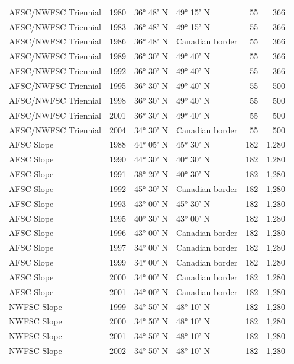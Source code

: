 \documentclass[
]{scrartcl}
\begin{document}
\begin{longtable}{lrllrr}
AFSC/NWFSC Triennial & 1980 &  36° 48' N & 49° 15' N  & 55 & 366 \\ 
AFSC/NWFSC Triennial & 1983 &  36° 48' N & 49° 15' N  & 55 & 366 \\ 
AFSC/NWFSC Triennial & 1986 &  36° 48' N & Canadian border & 55 & 366 \\ 
AFSC/NWFSC Triennial & 1989 &  36° 30' N &  49° 40' N  & 55 & 366 \\ 
AFSC/NWFSC Triennial & 1992 &  36° 30' N &  49° 40' N  & 55 & 366 \\ 
AFSC/NWFSC Triennial & 1995 &  36° 30' N &  49° 40' N  & 55 & 500 \\ 
AFSC/NWFSC Triennial & 1998 &  36° 30' N &  49° 40' N  & 55 & 500 \\ 
AFSC/NWFSC Triennial & 2001 &  36° 30' N &  49° 40' N  & 55 & 500 \\ 
AFSC/NWFSC Triennial & 2004 & 34° 30' N & Canadian border & 55 & 500 \\ 
AFSC Slope & 1988 &  44° 05' N &  45° 30' N & 182 & 1,280 \\ 
AFSC Slope & 1990 &  44° 30' N & 40° 30' N & 182 & 1,280 \\ 
AFSC Slope & 1991 &  38° 20' N & 40° 30' N  & 182 & 1,280 \\ 
AFSC Slope & 1992 &  45° 30' N & Canadian border & 182 & 1,280 \\ 
AFSC Slope & 1993 &  43° 00' N & 45° 30' N & 182 & 1,280 \\ 
AFSC Slope & 1995 &  40° 30' N & 43° 00' N & 182 & 1,280 \\ 
AFSC Slope & 1996 &  43° 00' N & Canadian border & 182 & 1,280 \\ 
AFSC Slope & 1997 &  34° 00' N & Canadian border & 182 & 1,280 \\ 
AFSC Slope & 1999 &  34° 00' N & Canadian border & 182 & 1,280 \\ 
AFSC Slope & 2000 &  34° 00' N & Canadian border & 182 & 1,280 \\ 
AFSC Slope & 2001 &  34° 00' N & Canadian border & 182 & 1,280 \\ 
NWFSC Slope & 1999 &  34° 50' N & 48° 10' N & 182 & 1,280 \\ 
NWFSC Slope & 2000 &  34° 50' N & 48° 10' N & 182 & 1,280 \\ 
NWFSC Slope & 2001 &  34° 50' N & 48° 10' N & 182 & 1,280 \\ 
NWFSC Slope & 2002 &  34° 50' N & 48° 10' N & 182 & 1,280 \\ 
\bottomrule

\end{longtable}
\end{document}

